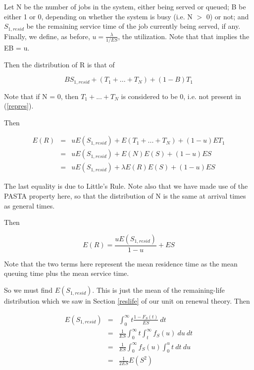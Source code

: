 Let N be the number of jobs in the system, either being served or 
queued; B be either 1 or 0, depending on whether the system is busy
(i.e. N $>$ 0) or not; and $S_{1,resid}$ be the remaining service time
of the job currently being served, if any.  Finally, we define, as
before, $u = \frac{\lambda}{1/ES}$, the utilization.  Note that that
implies the EB = u.

Then the distribution of R is that of 

\begin{equation}
\label{repres}
B S_{1,resid} + (T_1+...+T_N) + (1-B) T_1
\end{equation}

Note that if N = 0, then $T_1+...+T_N$ is considered to be 0, i.e. not
present in (\ref{repres}). 

Then 

\begin{eqnarray}
\label{mg1}
E(R) &=& u E(S_{1,resid}) + E(T_1+...+T_N) + (1-u) ET_1\\ 
&=& u E(S_{1,resid}) + E(N) E(S) + (1-u) ES \\
&=& u E(S_{1,resid}) + \lambda E(R) E(S) + (1-u) ES
\end{eqnarray} 

The last equality is due to  Little's Rule.  Note also that we have made
use of the PASTA property here, so that the distribution of N is the
same at arrival times as general times. 

Then

\begin{equation}
E(R) = \frac{u E(S_{1,resid})}{1-u} + ES
\end{equation}

Note that the two terms here represent the mean residence time as the
mean queuing time plus the mean service time.

So we must find $E(S_{1,resid})$.  This is just the mean of the
remaining-life distribution which we saw in Section \ref{reslife} of our
unit on renewal theory.  Then

\begin{eqnarray}
E(S_{1,resid}) &=& \int_0^\infty t \frac{1-F_S(t)}{ES} ~ dt  \\
&=& \frac{1}{ES} \int_0^\infty t \int_t^\infty f_S(u) ~du ~ dt \\
&=& \frac{1}{ES} \int_{0}^{\infty} f_S(u) \int_{0}^{u} t ~ dt ~ du \\
&=& \frac{1}{2ES} E(S^2)
\end{eqnarray}

